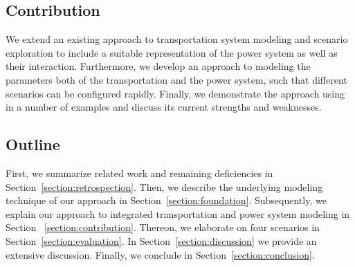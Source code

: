 \subsection{Contribution}

We extend an existing approach to transportation system modeling and scenario exploration to include a suitable representation of the power system as well as their interaction. Furthermore, we develop an approach to modeling the parameters both of the transportation and the power system, such that different scenarios can be configured rapidly. Finally, we demonstrate the approach using in a number of examples and discuss its current strengths and weaknesses.

\subsection{Outline}

First, we summarize related work and remaining deficiencies in Section~\ref{section:retrospection}. Then, we describe the underlying modeling technique of our approach in Section~\ref{section:foundation}. Subsequently, we explain our approach to integrated transportation and power system modeling in Section ~\ref{section:contribution}. Thereon, we elaborate on four scenarios in Section~\ref{section:evaluation}. In Section~\ref{section:discussion} we provide an extensive discussion. Finally, we conclude in Section~\ref{section:conclusion}.